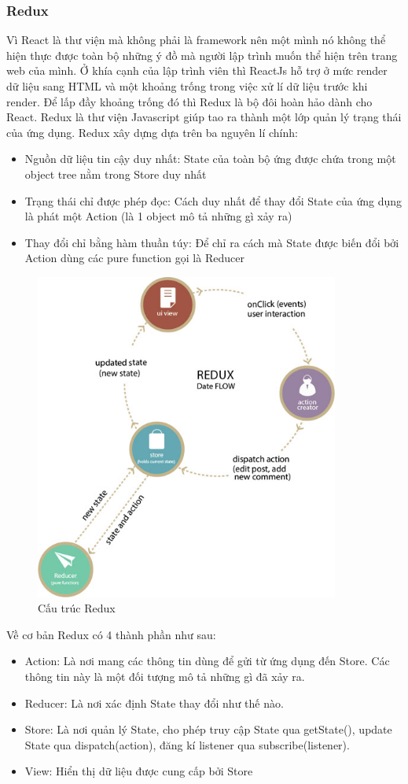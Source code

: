\subsubsection{Redux}
Vì React là thư viện mà không phải là framework nên một mình nó không thể hiện thực được toàn bộ những ý đồ mà người lập trình muốn thể hiện trên trang web của mình. Ở khía cạnh của lập trình viên thì ReactJs hỗ trợ ở mức render dữ liệu sang HTML và  một khoảng trống trong việc xử lí dữ liệu trước khi render. Để lấp đầy khoảng trống đó thì Redux là bộ đôi hoàn hảo dành cho React. Redux là thư viện Javascript giúp tao ra thành một lớp quản lý trạng thái của ứng dụng. Redux xây dựng dựa trên ba nguyên lí chính:
\begin{itemize}
    \item Nguồn dữ liệu tin cậy duy nhất: State của toàn bộ ứng được chứa trong một object tree nằm trong Store duy nhất
    \item Trạng thái chỉ được phép đọc: Cách duy nhất để thay đổi State của ứng dụng là phát một Action (là 1 object mô tả những gì xảy ra)
    \item Thay đổi chỉ bằng hàm thuần túy: Để chỉ ra cách mà State được biến đổi bởi Action dùng các pure function gọi là Reducer
\end{itemize}
\begin{figure}[h]
\centering
\includegraphics[width=10cm]{image/redux.png}
\caption{Cấu trúc Redux}
\end{figure}
Về cơ bản Redux có 4 thành phần như sau:
\begin{itemize}
    \item Action: Là nơi mang các thông tin dùng để gửi từ ứng dụng đến Store. Các thông tin này là một đối tượng mô tả những gì đã xảy ra.
    \item Reducer: Là nơi xác định State thay đổi như thế nào.
    \item Store: Là nơi quản lý State, cho phép truy cập State qua getState(), update State qua dispatch(action), đăng kí listener qua subscribe(listener).
    \item View: Hiển thị dữ liệu được cung cấp bởi Store
\end{itemize}

